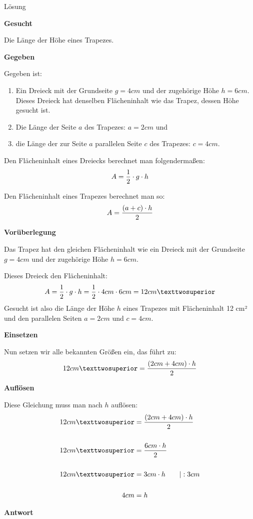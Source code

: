 \documentclass[
  ngerman,
]{book}
\providecommand{\tightlist}{%
  \setlength{\itemsep}{0pt}\setlength{\parskip}{0pt}}
\begin{document}
Lösung

\textbf{Gesucht}

Die Länge der Höhe eines Trapezes.

\textbf{Gegeben}

Gegeben ist:

\begin{enumerate}
\def\labelenumi{\arabic{enumi}.}
\tightlist
\item
  Ein Dreieck mit der Grundseite \(g = 4cm\) und der zugehörige Höhe \(h = 6cm\). Dieses Dreieck hat denselben Flächeninhalt wie das Trapez, dessen Höhe gesucht ist.
\item
  Die Länge der Seite \(a\) des Trapezes: \(a = 2cm\) und
\item
  die Länge der zur Seite \(a\) parallelen Seite \(c\) des Trapezes: \(c= 4cm\).
\end{enumerate}

Den Flächeninhalt eines Dreiecks berechnet man folgendermaßen:
\[ A = {1 \over 2} \cdot g \cdot h \]

Den Flächeninhalt eines Trapezes berechnet man so:
\[ A = {(a+c) \cdot h \over 2} \]

\textbf{Vorüberlegung}

Das Trapez hat den gleichen Flächeninhalt wie ein Dreieck mit der Grundseite \(g = 4cm\) und der zugehörige Höhe \(h = 6cm\).

Dieses Dreieck den Flächeninhalt:
\[ A = {1 \over 2} \cdot g \cdot h = {1 \over 2} \cdot 4 cm \cdot 6 cm = 12 cm² \]
Gesucht ist also die Länge der Höhe \(h\) eines Trapezes mit Flächeninhalt 12 cm² und den parallelen Seiten \(a = 2cm\) und \(c = 4cm\).

\textbf{Einsetzen}

Nun setzen wir alle bekannten Größen ein, das führt zu:
\[ 12 cm² = {(2cm + 4 cm) \cdot h \over 2} \]

\textbf{Auflösen}

Diese Gleichung muss man nach \(h\) auflösen:
\[ \begin{align} 12 cm² &= {(2cm + 4 cm) \cdot h \over 2}\\
{}\\
12cm² &= {6cm \cdot h \over 2} \\
{}\\
12cm² &= 3cm \cdot h \quad\quad |:3cm\\
{}\\
4cm &=h\end{align} \]

\textbf{Antwort}
\end{document}
